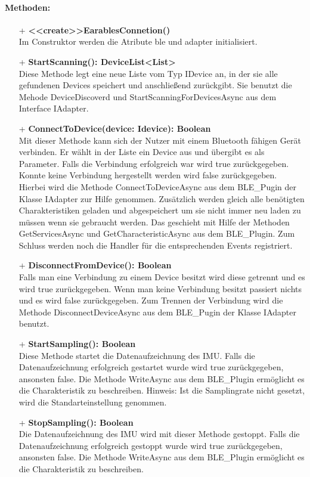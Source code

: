 \documentclass[a4paper,12pt]{article}
\begin{document}
\paragraph{Methoden:}
\begin{itemize}
	\item[+] \textbf{<<create>>EarablesConnetion()}\\ Im Construktor werden die Atribute ble und adapter initialisiert.
	\item[+] \textbf{StartScanning(): DeviceList<List>}\\ Diese Methode legt eine neue Liste vom Typ IDevice an, in der sie alle gefundenen Devices speichert und anschließend zurückgibt. Sie benutzt die Mehode DeviceDiscoverd und StartScanningForDevicesAsync aus dem Interface IAdapter.
	\item[+] \textbf{ConnectToDevice(device: Idevice): Boolean}\\ Mit dieser Methode kann sich der Nutzer mit einem Bluetooth fähigen Gerät verbinden. Er wählt in der Liste  ein Device aus und übergibt es als Parameter. Falls die Verbindung erfolgreich war wird true zurückgegeben. Konnte keine Verbindung hergestellt werden wird false zurückgegeben. Hierbei wird die Methode ConnectToDeviceAsync aus dem BLE\_Pugin der Klasse IAdapter zur Hilfe genommen. Zusätzlich werden gleich alle benötigten Charakteristiken geladen und abgespeichert um sie nicht immer neu laden zu müssen wenn sie gebraucht werden. Das geschieht mit Hilfe der Methoden GetServicesAsync und GetCharacteristicAsync aus dem BLE\_Plugin. Zum Schluss werden noch die Handler für die entsprechenden Events registriert.
	\item[+] \textbf{DisconnectFromDevice(): Boolean}\\ Falls man eine Verbindung zu einem Device besitzt wird diese getrennt und es wird true zurückgegeben. Wenn man keine Verbindung besitzt passiert nichts und es wird false zurückgegeben. Zum Trennen der Verbindung wird die Methode DisconnectDeviceAsync aus dem BLE\_Pugin der Klasse IAdapter benutzt.
	\item[+] \textbf{StartSampling(): Boolean}\\ Diese Methode startet die Datenaufzeichnung des IMU. Falls die Datenaufzeichnung erfolgreich gestartet wurde wird true zurückgegeben, ansonsten false. Die Methode WriteAsync aus dem BLE\_Plugin ermöglicht es die Charakteristik zu beschreiben. Hinweis: Ist die Samplingrate nicht gesetzt, wird die Standarteinstellung genommen.
	\item[+] \textbf{StopSampling(): Boolean}\\Die Datenaufzeichnung des IMU wird mit dieser Methode gestoppt. Falls die Datenaufzeichnung erfolgreich gestoppt wurde wird true zurückgegeben, ansonsten false. Die Methode WriteAsync aus dem BLE\_Plugin ermöglicht es die Charakteristik zu beschreiben.

\end{itemize}
\end{document}
